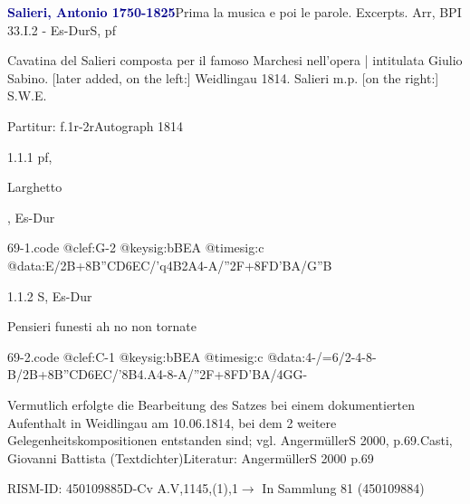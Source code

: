 \documentclass[a4paper, twocolumn, 11pt]{book}
\begin{document}
\par \vspace{16pt} \textcolor{darkblue}{\textbf{Salieri, Antonio  1750-1825}}\hfillplus{[69]}\newline Prima la musica e poi le parole. Excerpts. Arr, BPI 33.I.2 - Es-Dur\newline S, pf
\par \begin{itshape} Cavatina del Salieri composta per il famoso Marchesi nell'opera | intitulata Giulio Sabino. [later added, on the left:] Weidlingau 1814. Salieri m.p. [on the right:] S.W.E.\end{itshape} 
\par \textcolor{darkblue}{}  Partitur: f.1r-2r\newline Autograph  1814
\par 1.1.1  pf, \begin{itshape}Larghetto\end{itshape}, Es-Dur  
\begin{filecontents*}{69-1.code}
@clef:G-2
@keysig:bBEA
@timesig:c
@data:E/2B+{8B''C}{D6EC}/'q4B2A4-A/''2F+{8FD'BA}/{G''B}
\end{filecontents*}

\newline %
\par 1.1.2  S, Es-Dur\newline \begin{footnotesize} Pensieri funesti ah no non tornate \end{footnotesize}  
\begin{filecontents*}{69-2.code}
@clef:C-1
@keysig:bBEA
@timesig:c
@data:4-/=6/2-4-8-B/2B+{8B''C}D{6EC}/'8B4.A4-8-A/''2F+{8FD}'BA/4GG-
\end{filecontents*}

\newline %
\par Vermutlich erfolgte die Bearbeitung des Satzes bei einem dokumentierten Aufenthalt in Weidlingau am 10.06.1814, bei dem 2 weitere Gelegenheitskompositionen entstanden sind; vgl. AngermüllerS 2000, p.69.\newline Casti, Giovanni Battista  (Textdichter)\newline Literatur: AngermüllerS 2000  p.69
\par RISM-ID: 450109885\newline D-Cv  A.V,1145,(1),1\newline $\rightarrow$ In Sammlung 81 (450109884)
      
\end{document}
